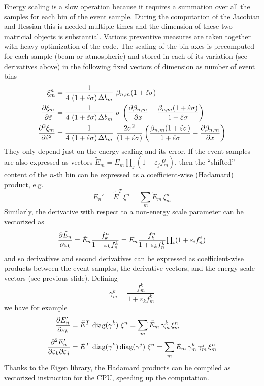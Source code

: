 \documentclass[a4paper, 11pt]{article}
\newcommand{\sk}{\hat\varepsilon}
\begin{document}
Energy scaling is a slow operation because it requires a summation over all the samples for each bin of the event sample.
During the computation of the Jacobian and Hessian this is needed multiple times and the dimension of these two matricial objects %
is substantial.
Various preventive measures are taken together with heavy optimization of the code.
The scaling of the bin axes is precomputed for each sample (beam or atmospheric) and stored in each of its variation (see derivatives above) %
in the following fixed vectors of dimension as number of event bins
\begin{align*}
	\xi^n_m &= \frac{1}{4\ (1+\sk \sigma)\, \Delta b_m}  \ 
	\beta_{n, m}(1+\sk \sigma) \\
	\pdv{\xi_m}{\sk} &= \frac{1}{4\ (1+\sk \sigma)\, \Delta b_m}\ 
	\sigma\ \qty(\pdv{\beta_{n, m}}{x} - \frac{\beta_{n,m}(1+\sk\sigma)}{1+\sk \sigma}) \\
	\pdv[2]{\xi_m}{\sk} &= \frac{1}{4\ (1+\sk \sigma)\, \Delta b_m}\ 
	\frac{2\sigma^2}{(1+\sk \sigma)}\,\qty(\frac{\beta_{n,m}(1+\sk\sigma)}{1+\sk \sigma} - \pdv{\beta_{n, m}}{x}) \\
\end{align*}
They only depend just on the energy scaling and its error.
If the event samples are also expressed as vectors $\tilde{E}_m = E_m \prod_j (1+\varepsilon_j f^j_m)$, %
then the ``shifted'' content of the $n$-th bin can be expressed as a coefficient-wise (Hadamard) product, e.g.\ 
\begin{equation}
	E_n' = \tilde{E}^T\ \xi^n = \sum_m \tilde{E}_m\, \xi^n_m
\end{equation}
Similarly, the derivative with respect to a non-energy scale parameter can be vectorized as
\begin{equation}
	\pdv{\tilde{E}_n}{\varepsilon_k} = \tilde{E}_n \frac{f_k^n}{1 + \varepsilon_k f_n^k} =
	E_n \frac{f_k^n}{1 + \varepsilon_k f_n^k}{\textstyle\prod_i} (1 + \varepsilon_i f_n^i) 
\end{equation}
and so derivatives and second derivatives can be expressed as coefficient-wise products between %
the event samples, the derivative vectors, and the energy scale vectors (see previous slide).
Defining
\[
	\gamma^k_m = \frac{f_m^k}{1+\varepsilon_k f_m^k}
\]
we have for example
\begin{align}
	\pdv{E_n'}{\varepsilon_k} &= \tilde{E}^T\ \text{diag}(\gamma^k)\ \xi^n %
	= \sum_m \tilde{E}_m\, \gamma^k_m\, \xi^n_m \\
	\pdv{E_n'}{\varepsilon_k}{\varepsilon_j} &=
	\tilde{E}^T\ \text{diag}(\gamma^k)\, \text{diag}(\gamma^j)\ \xi^n
	= \sum_m \tilde{E}_m\, \gamma^k_m\, \gamma^j_m\, \xi^n_m \\
\end{align}
Thanks to the Eigen library, the Hadamard products can be compiled as vectorized instruction for the CPU, %
speeding up the computation.
\end{document}
